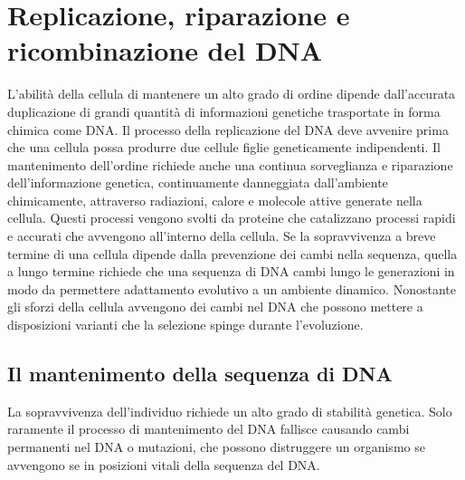 \chapter{Replicazione, riparazione e ricombinazione del DNA}
L'abilit\`a della cellula di mantenere un alto grado di ordine dipende dall'accurata duplicazione di grandi quantit\`a di informazioni genetiche trasportate in forma chimica come DNA.
Il processo della replicazione del DNA deve avvenire prima che una cellula possa produrre due cellule figlie geneticamente indipendenti. Il mantenimento dell'ordine richiede anche una
continua sorveglianza e riparazione dell'informazione genetica, continuamente danneggiata dall'ambiente chimicamente, attraverso radiazioni, calore e molecole attive generate nella 
cellula. Questi processi vengono svolti da proteine che catalizzano processi rapidi e accurati che avvengono all'interno della cellula. Se la sopravvivenza a breve termine di una cellula
dipende dalla prevenzione dei cambi nella sequenza, quella a lungo termine richiede che una sequenza di DNA cambi lungo le generazioni in modo da permettere adattamento evolutivo a un
ambiente dinamico. Nonostante gli sforzi della cellula avvengono dei cambi nel DNA che possono mettere a disposizioni varianti che la selezione spinge durante l'evoluzione.
\section{Il mantenimento della sequenza di DNA}
La sopravvivenza dell'individuo richiede un alto grado di stabilit\`a genetica. Solo raramente il processo di mantenimento del DNA fallisce causando cambi permanenti nel DNA o mutazioni, 
che possono distruggere un organismo se avvengono se in posizioni vitali della sequenza del DNA.
